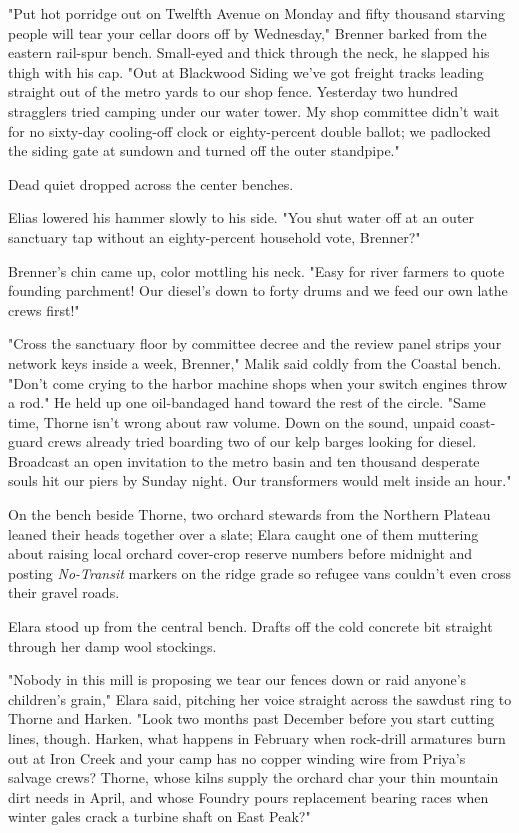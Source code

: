 "Put hot porridge out on Twelfth Avenue on Monday and fifty thousand starving people will tear your cellar doors off by Wednesday," Brenner barked from the eastern rail-spur bench. Small-eyed and thick through the neck, he slapped his thigh with his cap. "Out at Blackwood Siding we've got freight tracks leading straight out of the metro yards to our shop fence. Yesterday two hundred stragglers tried camping under our water tower. My shop committee didn't wait for no sixty-day cooling-off clock or eighty-percent double ballot; we padlocked the siding gate at sundown and turned off the outer standpipe."

Dead quiet dropped across the center benches.

Elias lowered his hammer slowly to his side. "You shut water off at an outer sanctuary tap without an eighty-percent household vote, Brenner?"

Brenner's chin came up, color mottling his neck. "Easy for river farmers to quote founding parchment! Our diesel's down to forty drums and we feed our own lathe crews first!"

"Cross the sanctuary floor by committee decree and the review panel strips your network keys inside a week, Brenner," Malik said coldly from the Coastal bench. "Don't come crying to the harbor machine shops when your switch engines throw a rod." He held up one oil-bandaged hand toward the rest of the circle. "Same time, Thorne isn't wrong about raw volume. Down on the sound, unpaid coast-guard crews already tried boarding two of our kelp barges looking for diesel. Broadcast an open invitation to the metro basin and ten thousand desperate souls hit our piers by Sunday night. Our transformers would melt inside an hour."

On the bench beside Thorne, two orchard stewards from the Northern Plateau leaned their heads together over a slate; Elara caught one of them muttering about raising local orchard cover-crop reserve numbers before midnight and posting \textit{No-Transit} markers on the ridge grade so refugee vans couldn't even cross their gravel roads.

Elara stood up from the central bench. Drafts off the cold concrete bit straight through her damp wool stockings.

"Nobody in this mill is proposing we tear our fences down or raid anyone's children's grain," Elara said, pitching her voice straight across the sawdust ring to Thorne and Harken. "Look two months past December before you start cutting lines, though. Harken, what happens in February when rock-drill armatures burn out at Iron Creek and your camp has no copper winding wire from Priya's salvage crews? Thorne, whose kilns supply the orchard char your thin mountain dirt needs in April, and whose Foundry pours replacement bearing races when winter gales crack a turbine shaft on East Peak?"


